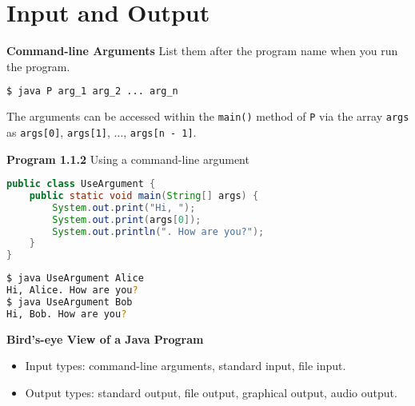 \documentclass[8pt,a4paper,compress]{beamer}
\begin{document}
\section{Input and Output}
\begin{frame}[fragile]
\pause

\textbf{Command-line Arguments} List them after the program name when you run the program.

\begin{lstlisting}[language=bash]
$ java P arg_1 arg_2 ... arg_n
\end{lstlisting}

The arguments can be accessed within the \lstinline$main()$ method of  \lstinline$P$ via the array \lstinline$args$  as \lstinline$args[0]$, \lstinline$args[1]$, $\dots$, \lstinline$args[n - 1]$.

\pause
\smallskip

\textbf{Program 1.1.2} Using a command-line argument

\begin{lstlisting}[language=Java]
public class UseArgument {
    public static void main(String[] args) {
        System.out.print("Hi, ");
        System.out.print(args[0]);
        System.out.println(". How are you?");
    }
}
\end{lstlisting}

\pause

\begin{lstlisting}[language=bash]
$ java UseArgument Alice
Hi, Alice. How are you?
$ java UseArgument Bob
Hi, Bob. How are you?
\end{lstlisting}

\pause
\smallskip

\textbf{Bird's-eye View of a Java Program}
\begin{center}
\end{center}
\begin{itemize}
\item Input types: command-line arguments, standard input, file input.
\item Output types: standard output, file output, graphical output, audio output.
\end{itemize}
\end{frame}
\end{document}
